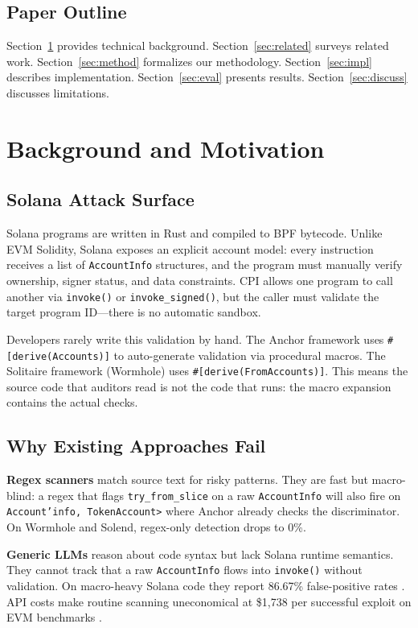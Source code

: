 \documentclass[conference]{IEEEtran}
\begin{document}
\subsection{Paper Outline}
Section~\ref{sec:background} provides technical background. Section~\ref{sec:related} surveys related work. Section~\ref{sec:method} formalizes our methodology. Section~\ref{sec:impl} describes implementation. Section~\ref{sec:eval} presents results. Section~\ref{sec:discuss} discusses limitations.

\section{Background and Motivation}
\label{sec:background}

\subsection{Solana Attack Surface}

Solana programs are written in Rust and compiled to BPF bytecode. Unlike EVM Solidity, Solana exposes an explicit account model: every instruction receives a list of \texttt{AccountInfo} structures, and the program must manually verify ownership, signer status, and data constraints. CPI allows one program to call another via \texttt{invoke()} or \texttt{invoke\_signed()}, but the caller must validate the target program ID---there is no automatic sandbox.

Developers rarely write this validation by hand. The Anchor framework uses \texttt{\#[derive(Accounts)]} to auto-generate validation via procedural macros. The Solitaire framework (Wormhole) uses \texttt{\#[derive(FromAccounts)]}. This means the source code that auditors read is not the code that runs: the macro expansion contains the actual checks.

\subsection{Why Existing Approaches Fail}

{\bf Regex scanners} match source text for risky patterns. They are fast but macro-blind: a regex that flags \texttt{try\_from\_slice} on a raw \texttt{AccountInfo} will also fire on \texttt{Account'{}info, TokenAccount>} where Anchor already checks the discriminator. On Wormhole and Solend, regex-only detection drops to 0\%.

{\bf Generic LLMs} reason about code syntax but lack Solana runtime semantics. They cannot track that a raw \texttt{AccountInfo} flows into \texttt{invoke()} without validation. On macro-heavy Solana code they report 86.67\% false-positive rates \cite{ackee2026trident_arena}. API costs make routine scanning uneconomical at \$1,738 per successful exploit on EVM benchmarks \cite{anthropic2025sconebench}.
\end{document}
